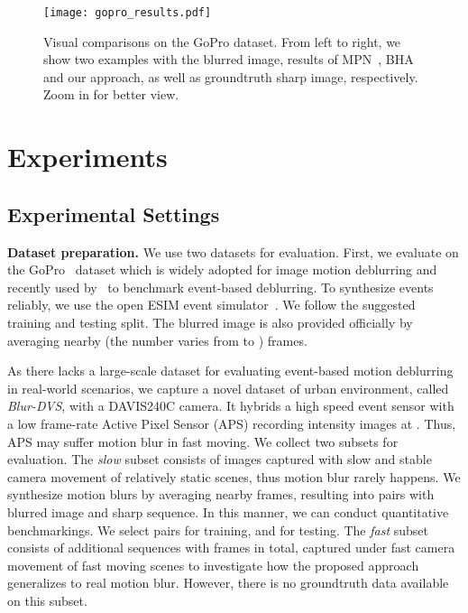 \documentclass[10pt,twocolumn,letterpaper]{article}
\begin{document}
\begin{figure*}
	\centering
	\texttt{[image: gopro\_results.pdf]}
	\caption{Visual comparisons on the GoPro dataset. From left to right, we show two examples with the blurred image, results of MPN~\cite{ZhangCVPR19}, BHA~\cite{PanCVPR19} and our approach, as well as groundtruth sharp image, respectively. Zoom in for better view.} 
	\label{fig:gopro_results}
	\vspace{-3mm}
\end{figure*}

\section{Experiments}
\subsection{Experimental Settings} 
\textbf{Dataset preparation.} We use two datasets for evaluation. First, we evaluate on the GoPro~\cite{NahCVPR17} dataset which is widely adopted for image motion deblurring and recently used by~\cite{PanCVPR19} to benchmark event-based deblurring. To synthesize events reliably, we use the open ESIM event simulator~\cite{RebecqCORL18}. We follow the suggested training and testing split. The blurred image is also provided officially by averaging nearby (the number varies from  to ) frames.

As there lacks a large-scale dataset for evaluating event-based motion deblurring in real-world scenarios, we capture a novel dataset of urban environment, called \textit{Blur-DVS}, with a DAVIS240C camera. It hybrids a high speed event sensor with a low frame-rate Active Pixel Sensor (APS) recording intensity images at  . Thus, APS may suffer motion blur in fast moving. We collect two subsets for evaluation. The \textit{slow} subset consists of  images captured with slow and stable camera movement of relatively static scenes, thus motion blur rarely happens. We synthesize motion blurs by averaging nearby  frames, resulting into  pairs with blurred image and sharp sequence. In this manner, we can conduct quantitative benchmarkings. We select  pairs for training, and  for testing. The \textit{fast} subset consists of additional  sequences with  frames in total, captured under fast camera movement of fast moving scenes to investigate how the proposed approach generalizes to real motion blur. However, there is no groundtruth data available on this subset.
\end{document}
